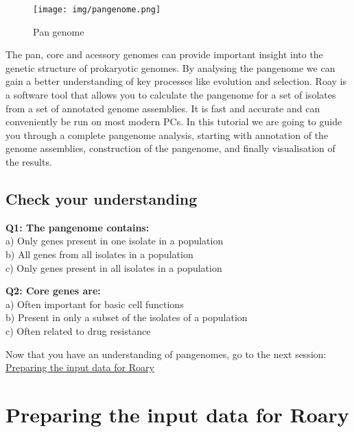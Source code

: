 \documentclass[11pt]{article}
\begin{document}
    \begin{figure}
\centering
\texttt{[image: img/pangenome.png]}
\caption{Pan genome}
\end{figure}

    The pan, core and acessory genomes can provide important insight into
the genetic structure of prokaryotic genomes. By analysing the pangenome
we can gain a better understanding of key processes like evolution and
selection. Roay is a software tool that allows you to calculate the
pangenome for a set of isolates from a set of annotated genome
assemblies. It is fast and accurate and can conveniently be run on most
modern PCs. In this tutorial we are going to guide you through a
complete pangenome analysis, starting with annotation of the genome
assemblies, construction of the pangenome, and finally visualisation of
the results.

\hypertarget{check-your-understanding}{%
\subsection{Check your understanding}\label{check-your-understanding}}

\textbf{Q1: The pangenome contains:}\\
a) Only genes present in one isolate in a population\\
b) All genes from all isolates in a population\\
c) Only genes present in all isolates in a population

\textbf{Q2: Core genes are:}\\
a) Often important for basic cell functions\\
b) Present in only a subset of the isolates of a population\\
c) Often related to drug resistance

Now that you have an understanding of pangenomes, go to the next
session: \href{prepare_data.ipynb}{Preparing the input data for Roary}





\newpage





    \hypertarget{preparing-the-input-data-for-roary}{%
\section{Preparing the input data for
Roary}\label{preparing-the-input-data-for-roary}}
\end{document}
